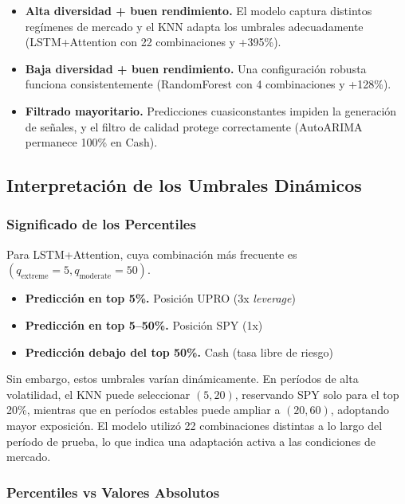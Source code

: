 \begin{itemize}
    \item \textbf{Alta diversidad + buen rendimiento.} El modelo captura distintos reg\'imenes de mercado y el KNN adapta los umbrales adecuadamente (LSTM+Attention con 22 combinaciones y +395\%).
    \item \textbf{Baja diversidad + buen rendimiento.} Una configuraci\'on robusta funciona consistentemente (RandomForest con 4 combinaciones y +128\%).
    \item \textbf{Filtrado mayoritario.} Predicciones cuasiconstantes impiden la generaci\'on de se\~nales, y el filtro de calidad protege correctamente (AutoARIMA permanece 100\% en Cash).
\end{itemize}

\subsection{Interpretaci\'on de los Umbrales Din\'amicos}
\label{app:threshold_interpretation}

\subsubsection{Significado de los Percentiles}

Para LSTM+Attention, cuya combinaci\'on m\'as frecuente es $(q_{\text{extreme}}{=}5, q_{\text{moderate}}{=}50)$.

\begin{itemize}
    \item \textbf{Predicci\'on en top 5\%.} Posici\'on UPRO (3x \textit{leverage})
    \item \textbf{Predicci\'on en top 5--50\%.} Posici\'on SPY (1x)
    \item \textbf{Predicci\'on debajo del top 50\%.} Cash (tasa libre de riesgo)
\end{itemize}

Sin embargo, estos umbrales var\'ian din\'amicamente. En per\'iodos de alta volatilidad, el KNN puede seleccionar $(5, 20)$, reservando SPY solo para el top 20\%, mientras que en per\'iodos estables puede ampliar a $(20, 60)$, adoptando mayor exposici\'on. El modelo utiliz\'o 22 combinaciones distintas a lo largo del per\'iodo de prueba, lo que indica una adaptaci\'on activa a las condiciones de mercado.

\subsubsection{Percentiles vs Valores Absolutos}

